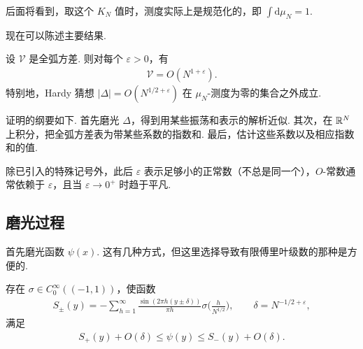 \begin{remark}\label{rem:7.10}
后面将看到，取这个 $K_N$ 值时，测度实际上是规范化的，即 $\int \mathrm{d}\mu_N = 1$.
\end{remark}

现在可以陈述主要结果.

\begin{theorem}\label{thm:7.11}
设 $\mathcal{V}$ 是全弧方差. 则对每个 $\varepsilon > 0$，有
\begin{align*}
  \mathcal{V}=O(N^{1+\varepsilon}).
\end{align*}
特别地，Hardy 猜想 $|\Delta| = O(N^{1/2+\varepsilon})$ 在 $\mu_N$-测度为零的集合之外成立.
\end{theorem}

证明的纲要如下. 首先磨光 $\Delta$，得到用某些振荡和表示的解析近似. 其次，在 $\mathbb{R}^N$ 上积分，把全弧方差表为带某些系数的指数和. 最后，估计这些系数以及相应指数和的值.

除已引入的特殊记号外，此后 $\varepsilon$ 表示足够小的正常数（不总是同一个），$O$-常数通常依赖于 $\varepsilon$，且当 $\varepsilon \to 0^+$ 时趋于平凡.

\subsection{磨光过程}

首先磨光函数 $\psi(x)$. 这有几种方式，但这里选择导致有限傅里叶级数的那种是方便的.

\begin{lemma}\label{lem:7.12}
存在 $\sigma \in C_0^\infty((-1,1))$，使函数
\begin{align*}
  S_{\pm}(y)=-\sum_{h=1}^{\infty}\frac{\sin(2\pi h(y\pm\delta))}{\pi h}\sigma\Big(\frac{h}{N^{1/2}}\Big),\qquad
  \delta=N^{-1/2+\varepsilon},
\end{align*}
满足
\begin{align*}
  S_{+}(y)+O(\delta)\leq\psi(y)\leq S_{-}(y)+O(\delta).
\end{align*}
\end{lemma}

